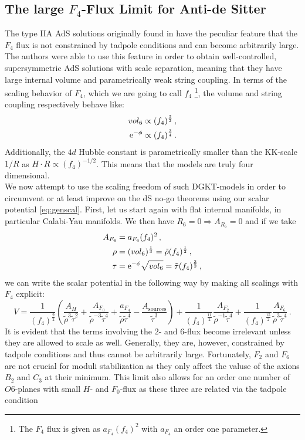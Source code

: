 \documentclass[12pt]{report}
\newcommand{\be}{\begin{equation}}
\newcommand{\ee}{\end{equation}}
\newcommand{\bea}{\begin{equation}\begin{aligned}}
\newcommand{\eea}{\end{aligned}\end{equation}}
\def\rme{{\rm e}}
\begin{document}
\subsection{The large $F_4$-Flux Limit for Anti-de Sitter}
The type IIA AdS solutions originally found in \cite{DeWolfe:2005uu} have the peculiar feature that the $F_4$ flux is not constrained by tadpole conditions and can become arbitrarily large. The authors were able to use this feature in order to obtain well-controlled, supersymmetric AdS solutions with scale separation, meaning that they have large internal volume and parametrically weak string coupling. In terms of the scaling behavior of $F_4$, which we are going to call $f_4$ \footnote{The $F_4$ flux is given as $a_{F_4} (f_4)^ 2$ with $a_{F_4}$ an order one parameter.}, the volume and string coupling respectively behave like:
\bea 
vol_6 &\propto (f_4)^ {\frac{3}{2}}\,,\\
\rme^ {-\phi} &\propto (f_4)^ {\frac{3}{4}}\,.
\eea
Additionally, the $4d$ Hubble constant is parametrically smaller than the KK-scale $1/R$ as $H\cdot R \propto (f_4)^ {-1/2}$. This means that the models are truly four dimensional.\\
We now attempt to use the scaling freedom of such DGKT-models in order to circumvent or at least improve on the dS no-go theorems using our scalar potential \eqref{eq:genscal}. First, let us start again with flat internal manifolds, in particular Calabi-Yau manifolds. We then have $R_6=0 \Rightarrow A_{R_6} =0$ and if we take 
\bea 
A_{F_4} &= a_{F_4} (f_4)^ 2\,,\\
\rho &= (vol_6)^ {\frac{1}{3}} = \tilde{\rho} (f_4)^ {\frac{1}{2}}\,,\\
\tau &= \rme^ {-\phi} \sqrt{vol_6} = \tilde{\tau} (f_4)^ {\frac{3}{2}}\,,
\eea
we can write the scalar potential in the following way by making all scalings with $F_4$ explicit:
\be 
V = \frac{1}{(f_4)^ {\frac{9}{2}}} \left( \frac{A_H}{\tilde{\rho}^3 \tilde{\tau}^ 2} + \frac{A_{F_0}}{\tilde{\rho}^ {-3}\tilde{\tau}^ 4} + \frac{a_{F_4}}{\tilde{\rho}\tilde{\tau}^ 4} - \frac{A_{\text{sources}}}{\tilde{\tau}^ 3} \right) + \frac{1}{(f_4)^ {\frac{11}{2}}} \frac{A_{F_2}}{\tilde{\rho}^ {-1}\tilde{\tau}^ 4} + \frac{1}{(f_4)^ {\frac{15}{2}}} \frac{A_{F_6}}{\tilde{\rho}^3\tilde{\tau}^ 4}\,.
\ee
It is evident that the terms involving the $2$- and $6$-flux become irrelevant unless they are allowed to scale as well. Generally, they are, however, constrained by tadpole conditions and thus cannot be arbitrarily large. Fortunately, $F_2$ and $F_6$ are not crucial for moduli stabilization \cite{DeWolfe:2005uu} as they only affect the valuse of the axions $B_2$ and $C_3$ at their minimum. This limit also allows for an order one number of $O6$-planes with small $H$- and $F_0$-flux as these three are related via the tadpole condition
\end{document}
